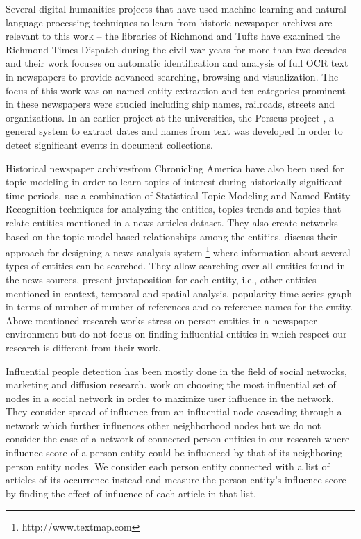 \documentclass[10pt,journal,compsoc]{IEEEtran}
\begin{document}
Several digital humanities projects that have used machine learning and natural language processing techniques to learn from historic newspaper archives are relevant to this work -- the libraries of Richmond and Tufts have examined the Richmond Times Dispatch during the civil war years for more than two decades and their work focuses on automatic identification and analysis of full OCR text in newspapers to provide advanced searching, browsing and visualization\cite{crane2006challenge}. The focus of this work was on named entity extraction and ten categories prominent in these newspapers were studied including ship names, railroads, streets and organizations. In an earlier project at the universities, the Perseus project \cite{smith2002detectinga, smith2002detectingb, smith2001disambiguating}, a general system to extract dates and names from text was developed in order to detect significant events in document collections. 

Historical newspaper archivesfrom Chronicling America have also been used for topic modeling in order to learn topics of interest during historically significant time periods\cite{yang2011topic}. \cite{newman2006analyzing} use a combination of Statistical Topic Modeling and Named Entity Recognition techniques for analyzing the entities, topics trends and topics that relate entities mentioned in a news articles dataset. They also create networks based on the topic model based relationships among the entities.
\cite{lloyd2005lydia} discuss their approach for designing a news analysis system \footnote{http://www.textmap.com} where information about several types of entities can be searched. They allow searching over all entities found in the news sources, present juxtaposition for each entity, i.e., other entities mentioned in context, temporal and spatial analysis, popularity time series graph in terms of number of number of references and co-reference names for the entity.
 Above mentioned research works stress on person entities in a newspaper environment but do not focus on finding influential entities in which respect our research is different from their work.

Influential people detection has been mostly done in the field of social networks, marketing and diffusion research.
\cite{kempe2003maximizing} work on choosing the most influential set of nodes  in a social network in order to maximize user influence in the network. They consider spread of influence from an influential node cascading through a network which further influences other neighborhood nodes but we do not consider the case of a network of connected person entities in our research where influence score of a person entity could be influenced by that of its neighboring person entity nodes. We consider each person entity connected with a list of articles of its occurrence instead and measure the person entity's influence score by finding the effect of influence of each article in that list.
 
\end{document}
